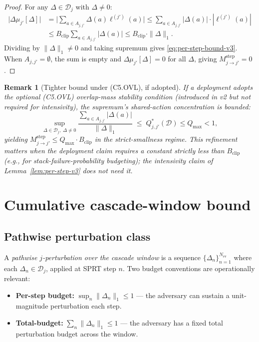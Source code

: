 \documentclass{article}
\newtheorem{remark}{Remark}
\newcommand{\Bclip}{B_{\mathrm{clip}}}
\newcommand{\Nev}{N_{\mathrm{ev}}}
\begin{document}
\begin{proof}
For any $\Delta \in \mathcal{D}_j$ with $\Delta \neq 0$:
\begin{align*}
  \big| \Delta\mu_{j'}[\Delta] \big|
  &= \big| \sum_{a \in A_{j, j'}} \Delta(a) \ell^{(j')}(a) \big|
  \leq \sum_{a \in A_{j, j'}} |\Delta(a)| \cdot |\ell^{(j')}(a)|
  \\ &\leq \Bclip \sum_{a \in A_{j, j'}} |\Delta(a)|
  \leq \Bclip \cdot \|\Delta\|_1.
\end{align*}
Dividing by $\|\Delta\|_1 \neq 0$ and taking supremum gives
\eqref{eq:per-step-bound-v3}.  When $A_{j, j'} = \emptyset$, the
sum is empty and $\Delta\mu_{j'}[\Delta] = 0$ for all $\Delta$,
giving $M_{j \to j'}^{\mathrm{step}} = 0$.
\end{proof}

\begin{remark}[Tighter bound under (C5.OVL), if adopted]
\label{rem:tighter-v3}
If a deployment adopts the optional (C5.OVL) overlap-mass
stability condition (introduced in v2 but \emph{not} required for
intensivity), the supremum's shared-action concentration is
bounded:
\[
  \sup_{\Delta \in \mathcal{D}_j,\; \Delta \neq 0}
  \frac{\sum_{a \in A_{j, j'}} |\Delta(a)|}{\|\Delta\|_1}
  \;\leq\; Q^*_{j, j'}(\mathcal{D}) \leq Q_{\max} < 1,
\]
yielding $M_{j \to j'}^{\mathrm{step}} \leq Q_{\max} \cdot \Bclip$
in the strict-smallness regime.  This refinement matters when the
deployment claim requires a constant strictly less than $\Bclip$
(e.g., for stack-failure-probability budgeting); the intensivity
claim of Lemma~\ref{lem:per-step-v3} does not need it.
\end{remark}

\section{Cumulative cascade-window bound}

\subsection{Pathwise perturbation class}

A \emph{pathwise $j$-perturbation over the cascade window} is a
sequence $\{\Delta_n\}_{n=1}^{\Nev}$ where each
$\Delta_n \in \mathcal{D}_j$, applied at SPRT step $n$.  Two
budget conventions are operationally relevant:

\begin{itemize}
\item \textbf{Per-step budget:} $\sup_n \|\Delta_n\|_1 \leq 1$ ---
  the adversary can sustain a unit-magnitude perturbation each
  step.
\item \textbf{Total-budget:} $\sum_n \|\Delta_n\|_1 \leq 1$ --- the
  adversary has a fixed total perturbation budget across the
  window.
\end{itemize}
\end{document}
